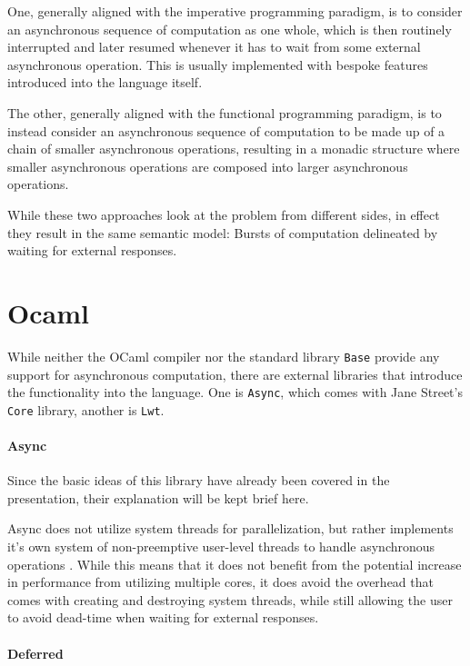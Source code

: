 \documentclass[a4paper,UKenglish,cleveref, autoref, thm-restate]{lipics-v2021}
\begin{document}
One, generally aligned with the imperative programming paradigm, is to consider an asynchronous sequence of computation as one whole, which is then routinely interrupted and later resumed whenever it has to wait from some external asynchronous operation. This is usually implemented with bespoke features introduced into the language itself.

The other, generally aligned with the functional programming paradigm, is to instead consider an asynchronous sequence of computation to be made up of a chain of smaller asynchronous operations, resulting in a monadic structure where smaller asynchronous operations are composed into larger asynchronous operations.

While these two approaches look at the problem from different sides, in effect they result in the same semantic model: Bursts of computation delineated by waiting for external responses.

\section{Ocaml}
\label{sec:ocaml}

While neither the OCaml compiler nor the standard library \verb|Base| provide any support for asynchronous computation, there are external libraries that introduce the functionality into the language. One is \verb|Async|, which comes with Jane Street's \verb|Core| library, another is \verb|Lwt|.

\paragraph*{Async}

Since the basic ideas of this library have already been covered in the presentation, their explanation will be kept brief here.

Async does not utilize system threads for parallelization, but rather implements it's own system of non-preemptive user-level threads to handle asynchronous operations \cite{Concurre6:online}. While this means that it does not benefit from the potential increase in performance from utilizing multiple cores, it does avoid the overhead that comes with creating and destroying system threads, while still allowing the user to avoid dead-time when waiting for external responses.

\paragraph*{Deferred}
\end{document}
